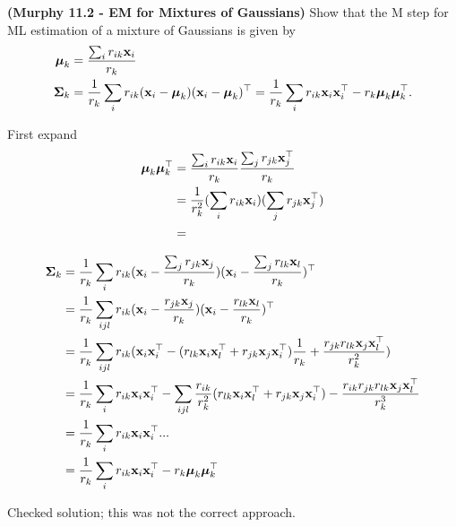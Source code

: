 \documentclass[12pt,letterpaper,fleqn]{hmcpset}
\begin{document}
\begin{problem}[1]
\textbf{(Murphy 11.2 - EM for Mixtures of Gaussians)} Show that the M step for ML
estimation of a mixture of Gaussians is given by
\begin{align*}
    \hbox{\boldmath$\mu$}_k &= \frac{\sum_i r_{ik}{\bf x}_i}{r_k}\\
    \hbox{\boldmath$\Sigma$}_k &= \frac{1}{r_k}\sum_i r_{ik}({\bf x}_i - \hbox{\boldmath$\mu$}_k)({\bf x}_i - \hbox{\boldmath$\mu$}_k)^\top = \frac{1}{r_k}\sum_i r_{ik}{\bf x}_i{\bf x}_i^\top - r_k\hbox{\boldmath$\mu$}_k\hbox{\boldmath$\mu$}_k^\top.
\end{align*}
\end{problem}
\begin{solution}

  First expand
\begin{align*}
    \hbox{\boldmath$\mu$}_k\hbox{\boldmath$\mu$}_k^\top &= \frac{\sum_i r_{ik}{\bf x}_i}{r_k} \frac{\sum_j r_{jk}{\bf x}_j^\top}{r_k} \\
    &= \frac{1}{r_k^2} ( \sum_i r_{ik} {\bf x}_i ) ( \sum_j r_{jk} {\bf x}_j^\top ) \\
    &= 
\end{align*}

\begin{align*}
  \hbox{\boldmath$\Sigma$}_k &= \frac{1}{r_k}\sum_i r_{ik}({\bf x}_i - \frac{\sum_j r_{jk}{\bf x}_j}{r_k}) ({\bf x}_i - \frac{\sum_j r_{lk}{\bf x}_l}{r_k})^\top \\
  &= \frac{1}{r_k}\sum_{ijl} r_{ik}({\bf x}_i - \frac{r_{jk}{\bf x}_j}{r_k}) ({\bf x}_i - \frac{r_{lk}{\bf x}_l}{r_k})^\top \\
  &= \frac{1}{r_k}\sum_{ijl} r_{ik} ( {\bf x}_i{\bf x}_i^\top - (r_{lk} {\bf x}_i{\bf x}_l^\top + r_{jk} {\bf x}_j{\bf x}_i^\top) \frac{1}{r_k} + \frac{r_{jk}r_{lk} {\bf x}_j {\bf x}_l^\top}{r_k^2} ) \\
  &= \frac{1}{r_k}\sum_{i} r_{ik} {\bf x}_i{\bf x}_i^\top - \sum_{ijl} \frac {r_{ik}}{r_k^2} (r_{lk} {\bf x}_i{\bf x}_l^\top + r_{jk} {\bf x}_j{\bf x}_i^\top) - \frac{r_{ik}r_{jk}r_{lk} {\bf x}_j {\bf x}_l^\top}{r_k^3}  \\
  &= \frac{1}{r_k}\sum_{i} r_{ik} {\bf x}_i{\bf x}_i^\top ... \\
  &= \frac{1}{r_k}\sum_{i} r_{ik} {\bf x}_i{\bf x}_i^\top - r_k \hbox{\boldmath$\mu$}_k \hbox{\boldmath$\mu$}_k^\top
\end{align*}

Checked solution; this was not the correct approach.



\end{solution}

\vfill
\newpage
\end{document}
